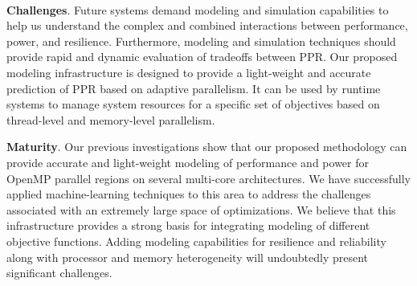 \documentclass{article}  %
\begin{document}
\vspace{10pt}

   \\
\textbf{Challenges}. 
Future systems demand modeling and simulation capabilities to help us
understand the complex and combined interactions between performance,
power, and resilience. Furthermore, modeling and simulation techniques
should provide rapid and dynamic evaluation of tradeoffs between
PPR. Our proposed modeling infrastructure is designed to provide a
light-weight and accurate prediction of PPR based on adaptive
parallelism. It can be used by runtime systems to manage system
resources for a specific set of objectives based on thread-level and
memory-level parallelism.  


\noindent\textbf{Maturity}. 
Our previous investigations show that our
proposed methodology can provide accurate and light-weight modeling 
of performance and power for OpenMP parallel regions on several
multi-core architectures. We have successfully applied
machine-learning techniques to this area to address the challenges
associated with an extremely large space of optimizations. We believe
that this infrastructure provides a strong basis for integrating
modeling of different objective functions. Adding modeling
capabilities for resilience and reliability along with processor and
memory heterogeneity will undoubtedly present significant challenges. 

\end{document}
